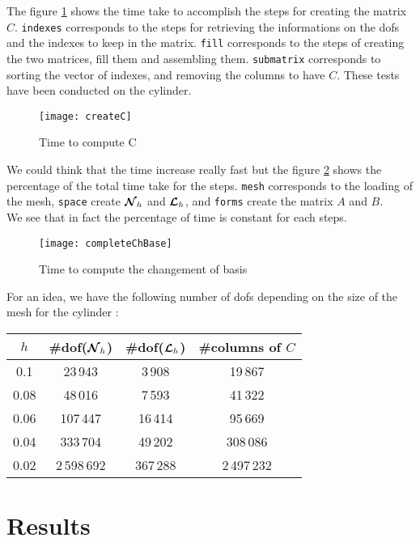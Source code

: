 The figure \ref{timeC} shows the time take to accomplish the steps for creating the matrix $C$. \texttt{indexes} corresponds to the steps for retrieving the informations on the dofs and the indexes to keep in the matrix. \texttt{fill} corresponds to the steps of creating the two matrices, fill them and assembling them. \texttt{submatrix} corresponds to sorting the vector of indexes, and removing the columns to have $C$. These tests have been conducted on the cylinder.\\

\begin{figure}[H]
  \centering
  \texttt{[image: createC]}
  \caption{Time to compute C}
  \label{timeC}
\end{figure}

We could think that the time increase really fast but the figure \ref{completeTime} shows the percentage of the total time take for the steps. \texttt{mesh} corresponds to the loading of the mesh, \texttt{space} create ${\bm{\mathcal{N}}}_h$ and ${\bm{\mathcal{L}}}_h$, and \texttt{forms} create the matrix $A$ and $B$.\\
We see that in fact the percentage of time is constant for each steps.

\begin{figure}[H]
  \centering
  \texttt{[image: completeChBase]}
  \caption{Time to compute the changement of basis}
  \label{completeTime}
\end{figure}

For an idea, we have the following number of dofs depending on the size of the mesh for the cylinder :
\begin{center}
  \begin{tabular}{ c | c | c | c }
    $h$ & \#dof(${\bm{\mathcal{N}}}_h$) & \#dof(${\bm{\mathcal{L}}}_h$) & \#columns of $C$ \\ \hline
    0.1 & 23\,943 & 3\,908 & 19\,867 \\ \hline
    0.08 & 48\,016 & 7\,593 & 41\,322 \\ \hline
    0.06 & 107\,447 & 16\,414 & 95\,669 \\ \hline
    0.04 & 333\,704 & 49\,202 & 308\,086 \\ \hline
    0.02 & 2\,598\,692 & 367\,288 & 2\,497\,232 \\ \hline
  \end{tabular}
\end{center}

\section{Results}

